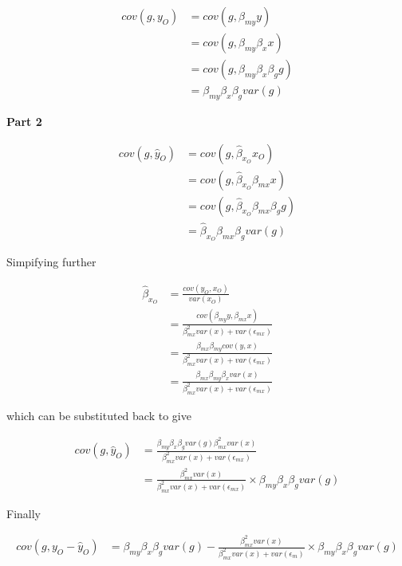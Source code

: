 \documentclass[]{article}
\begin{document}
\[
\begin{aligned}
cov(g, y_O) & = cov(g, \beta_{my} y) \\
            & = cov(g, \beta_{my} \beta_x x) \\
            & = cov(g, \beta_{my} \beta_x \beta_g g) \\
            & = \beta_{my} \beta_x \beta_g var(g)
\end{aligned}
\]

\textbf{Part 2}

\[
\begin{aligned}
cov(g, \hat{y}_O) & = cov(g, \hat{\beta}_{x_O} x_O) \\
                  & = cov(g, \hat{\beta}_{x_O} \beta_{mx} x) \\
                  & = cov(g, \hat{\beta}_{x_O} \beta_{mx} \beta_g g) \\
                  & = \hat{\beta}_{x_O} \beta_{mx} \beta_g var(g)
\end{aligned}
\]

Simpifying further

\[
\begin{aligned}
\hat{\beta}_{x_O} & = \frac{cov(y_O, x_O)} {var(x_O)} \\
                  & = \frac{cov(\beta_{my} y, \beta_{mx} x)} {\beta_{mx}^2 var(x) + var(\epsilon_{mx})} \\
                  & = \frac{\beta_{mx} \beta_{my} cov(y, x)} {\beta_{mx}^2 var(x) + var(\epsilon_{mx})} \\
                  & = \frac{\beta_{mx} \beta_{my} \beta_x var(x)} {\beta_{mx}^2 var(x) + var(\epsilon_{mx})}
\end{aligned}
\]

which can be substituted back to give

\[
\begin{aligned}
cov(g, \hat{y}_O) & = \frac{\beta_{my} \beta_x \beta_g var(g) \beta_{mx}^2 var(x)} {\beta_{mx}^2 var(x) + var(\epsilon_{mx})} \\
                  & = \frac{\beta_{mx}^2 var(x)} {\beta_{mx}^2 var(x) + var(\epsilon_{mx})} \times \beta_{my} \beta_x \beta_g var(g)
\end{aligned}
\]

Finally

\[
\begin{aligned}
cov(g, y_O - \hat{y}_O) & = \beta_{my} \beta_x \beta_g var(g) - \frac{\beta_{mx}^2 var(x)} {\beta_{mx}^2 var(x) + var(\epsilon_m)} \times \beta_{my} \beta_x \beta_g var(g)
\end{aligned}
\]
\end{document}
